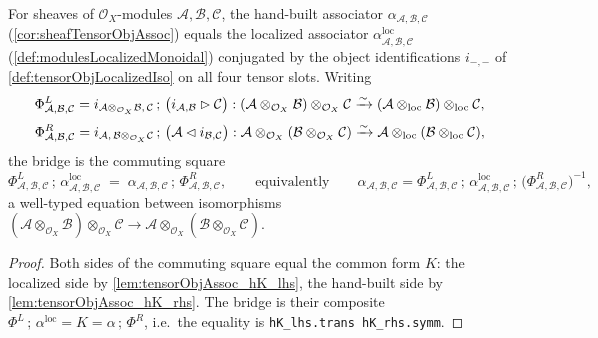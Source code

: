 \begin{lemma}
  \label{lem:tensorObjAssoc_eq_localizedAssociator}
  For sheaves of \(\mathcal{O}_X\)-modules \(\mathcal{A}, \mathcal{B},
  \mathcal{C}\), the hand-built associator
  \(\alpha_{\mathcal{A},\mathcal{B},\mathcal{C}}\) (\cref{cor:sheafTensorObjAssoc})
  equals the localized associator
  \(\alpha^{\mathrm{loc}}_{\mathcal{A},\mathcal{B},\mathcal{C}}\)
  (\cref{def:modulesLocalizedMonoidal}) conjugated by the object identifications
  \(i_{-,-}\) of \cref{def:tensorObjLocalizedIso} on all four tensor slots. Writing
  \[
    \Phi^{L}_{\mathcal{A},\mathcal{B},\mathcal{C}}
      = i_{\mathcal{A} \otimes_{\mathcal{O}_X} \mathcal{B},\,\mathcal{C}}
        \,;\, \bigl(i_{\mathcal{A},\mathcal{B}} \rhd \mathcal{C}\bigr)
      : (\mathcal{A} \otimes_{\mathcal{O}_X} \mathcal{B})
          \otimes_{\mathcal{O}_X} \mathcal{C}
        \xrightarrow{\sim}
        (\mathcal{A} \mathbin{\otimes_{\mathrm{loc}}} \mathcal{B}) \mathbin{\otimes_{\mathrm{loc}}} \mathcal{C},
  \]
  \[
    \Phi^{R}_{\mathcal{A},\mathcal{B},\mathcal{C}}
      = i_{\mathcal{A},\,\mathcal{B} \otimes_{\mathcal{O}_X} \mathcal{C}}
        \,;\, \bigl(\mathcal{A} \lhd i_{\mathcal{B},\mathcal{C}}\bigr)
      : \mathcal{A} \otimes_{\mathcal{O}_X}
          (\mathcal{B} \otimes_{\mathcal{O}_X} \mathcal{C})
        \xrightarrow{\sim}
        \mathcal{A} \mathbin{\otimes_{\mathrm{loc}}} (\mathcal{B} \mathbin{\otimes_{\mathrm{loc}}} \mathcal{C}),
  \]
  the bridge is the commuting square
  \[
    \Phi^{L}_{\mathcal{A},\mathcal{B},\mathcal{C}} \,;\,
      \alpha^{\mathrm{loc}}_{\mathcal{A},\mathcal{B},\mathcal{C}}
      \;=\;
      \alpha_{\mathcal{A},\mathcal{B},\mathcal{C}} \,;\,
      \Phi^{R}_{\mathcal{A},\mathcal{B},\mathcal{C}},
    \qquad\text{equivalently}\qquad
    \alpha_{\mathcal{A},\mathcal{B},\mathcal{C}}
      = \Phi^{L}_{\mathcal{A},\mathcal{B},\mathcal{C}} \,;\,
        \alpha^{\mathrm{loc}}_{\mathcal{A},\mathcal{B},\mathcal{C}} \,;\,
        \bigl(\Phi^{R}_{\mathcal{A},\mathcal{B},\mathcal{C}}\bigr)^{-1},
  \]
  a well-typed equation between isomorphisms
  \((\mathcal{A} \otimes_{\mathcal{O}_X} \mathcal{B}) \otimes_{\mathcal{O}_X}
  \mathcal{C} \to \mathcal{A} \otimes_{\mathcal{O}_X}
  (\mathcal{B} \otimes_{\mathcal{O}_X} \mathcal{C})\).
\end{lemma}

\begin{proof}
  Both sides of the commuting square equal the common form \(K\): the localized
  side by \cref{lem:tensorObjAssoc_hK_lhs}, the hand-built side by
  \cref{lem:tensorObjAssoc_hK_rhs}. The bridge is their composite
  \(\Phi^{L}\,;\,\alpha^{\mathrm{loc}} = K = \alpha\,;\,\Phi^{R}\), i.e.\ the equality
  is \texttt{hK\_lhs.trans hK\_rhs.symm}.
\end{proof}

